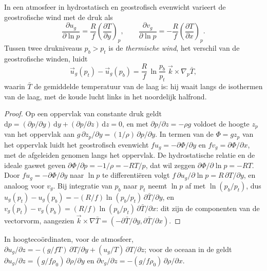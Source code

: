 \begin{theorem}\label{thm:b3:gfd-foundations:thermal-wind}
In een atmosfeer in hydrostatisch en geostrofisch evenwicht varieert de geostrofische
wind met de druk als
\[
\frac{\partial u_g}{\partial\ln p} = \frac{R}{f}\left(\frac{\partial T}{\partial y}\right)_p ,
\qquad
\frac{\partial v_g}{\partial\ln p} = -\frac{R}{f}\left(\frac{\partial T}{\partial x}\right)_p .
\]
Tussen twee drukniveaus $p_b > p_t$ is de \emph{thermische
wind}, het verschil van de geostrofische winden, luidt
\[
\vec u_g(p_t) - \vec u_g(p_b) = \frac{R}{f}\,\ln\frac{p_b}{p_t}\;\vec k\times\nabla_p\bar T ,
\]
waarin $\bar T$ de gemiddelde temperatuur van de laag is: hij waait langs de
isothermen van de laag, met de koude lucht links in het
noordelijk halfrond.
\end{theorem}

\begin{proof}
Op een oppervlak van constante druk geldt $\mathrm dp = (\partial p/\partial y)
\,\mathrm dy + (\partial p/\partial z)\,\mathrm dz = 0$, en met
$\partial p/\partial z = -\rho g$ voldoet de hoogte $z_p$ van het oppervlak aan
$g\,\partial z_p/\partial y = (1/\rho)\,\partial p/\partial y$. In termen van
de  $\Phi = gz_p$ van het oppervlak luidt het geostrofisch evenwicht
$fu_g = -\partial\Phi/\partial y$ en $fv_g = \partial\Phi/\partial x$, met
de afgeleiden genomen langs het oppervlak. De hydrostatische relatie en de
ideale gaswet geven $\partial\Phi/\partial p = -1/\rho = -RT/p$, dat wil zeggen
$\partial\Phi/\partial\ln p = -RT$. Door $fu_g =
-\partial\Phi/\partial y$ naar $\ln p$ te differentiëren volgt $f\,\partial
u_g/\partial\ln p = R\,\partial T/\partial y$, en analoog voor $v_g$.
Bij integratie van $p_b$ naar $p_t$ neemt $\ln p$ af met $\ln(p_b/p_t)$, dus
$u_g(p_t) - u_g(p_b) = -(R/f)\ln(p_b/p_t)\,\partial\bar T/\partial y$, en
$v_g(p_t) - v_g(p_b) = (R/f)\ln(p_b/p_t)\,\partial\bar T/\partial x$: dit zijn de
componenten van de vectorvorm, aangezien $\vec k\times\nabla\bar T =
(-\partial\bar T/\partial y, \partial\bar T/\partial x)$.
\end{proof}

\begin{corollary}\label{cor:b3:gfd-foundations:thermal-wind-z}
In hoogtecoördinaten, voor de atmosfeer, $\partial u_g/\partial z =
-(g/fT)\,\partial T/\partial y + (u_g/T)\,\partial T/\partial z$; voor de
oceaan in de  geldt $\partial u_g/\partial z =
(g/f\rho_0)\,\partial\rho/\partial y$ en $\partial v_g/\partial z =
-(g/f\rho_0)\,\partial\rho/\partial x$.
\end{corollary}

